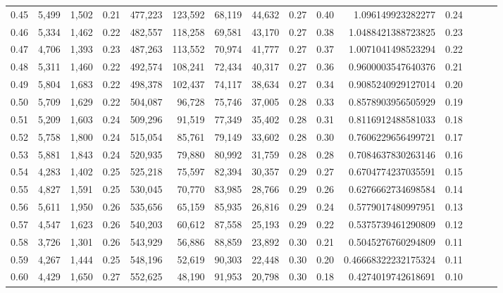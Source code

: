 \begin{tabular}{rrrrrrrrrrrrrrr}
0.45 &   5,499 &  1,502 &  0.21 &  477,223 &  123,592 &   68,119 &   44,632 &  0.27 &  0.40 &     1.096149923282277 &      0.24 \\
0.46 &   5,334 &  1,462 &  0.22 &  482,557 &  118,258 &   69,581 &   43,170 &  0.27 &  0.38 &    1.0488421388723825 &      0.23 \\
0.47 &   4,706 &  1,393 &  0.23 &  487,263 &  113,552 &   70,974 &   41,777 &  0.27 &  0.37 &    1.0071041498523294 &      0.22 \\
0.48 &   5,311 &  1,460 &  0.22 &  492,574 &  108,241 &   72,434 &   40,317 &  0.27 &  0.36 &    0.9600003547640376 &      0.21 \\
0.49 &   5,804 &  1,683 &  0.22 &  498,378 &  102,437 &   74,117 &   38,634 &  0.27 &  0.34 &    0.9085240929127014 &      0.20 \\
0.50 &   5,709 &  1,629 &  0.22 &  504,087 &   96,728 &   75,746 &   37,005 &  0.28 &  0.33 &    0.8578903956505929 &      0.19 \\
0.51 &   5,209 &  1,603 &  0.24 &  509,296 &   91,519 &   77,349 &   35,402 &  0.28 &  0.31 &    0.8116912488581033 &      0.18 \\
0.52 &   5,758 &  1,800 &  0.24 &  515,054 &   85,761 &   79,149 &   33,602 &  0.28 &  0.30 &    0.7606229656499721 &      0.17 \\
0.53 &   5,881 &  1,843 &  0.24 &  520,935 &   79,880 &   80,992 &   31,759 &  0.28 &  0.28 &    0.7084637830263146 &      0.16 \\
0.54 &   4,283 &  1,402 &  0.25 &  525,218 &   75,597 &   82,394 &   30,357 &  0.29 &  0.27 &    0.6704774237035591 &      0.15 \\
0.55 &   4,827 &  1,591 &  0.25 &  530,045 &   70,770 &   83,985 &   28,766 &  0.29 &  0.26 &    0.6276662734698584 &      0.14 \\
0.56 &   5,611 &  1,950 &  0.26 &  535,656 &   65,159 &   85,935 &   26,816 &  0.29 &  0.24 &    0.5779017480997951 &      0.13 \\
0.57 &   4,547 &  1,623 &  0.26 &  540,203 &   60,612 &   87,558 &   25,193 &  0.29 &  0.22 &    0.5375739461290809 &      0.12 \\
0.58 &   3,726 &  1,301 &  0.26 &  543,929 &   56,886 &   88,859 &   23,892 &  0.30 &  0.21 &    0.5045276760294809 &      0.11 \\
0.59 &   4,267 &  1,444 &  0.25 &  548,196 &   52,619 &   90,303 &   22,448 &  0.30 &  0.20 &   0.46668322232175324 &      0.11 \\
0.60 &   4,429 &  1,650 &  0.27 &  552,625 &   48,190 &   91,953 &   20,798 &  0.30 &  0.18 &    0.4274019742618691 &      0.10 \\

\end{tabular}
